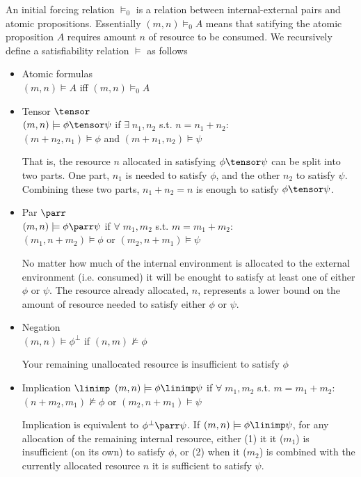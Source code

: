 An initial forcing relation $\models_0$ is a relation between
internal-external pairs and atomic propositions.  Essentially
$(m,n) \models_0 A$
means that satifying the atomic proposition $A$ requires amount $n$ of
resource to be consumed.  We recursively define a satisfiability
relation $\models$ as follows
\begin{itemize}
\item Atomic formulas\\
$(m,n) \models A$ iff $(m,n) \models_0 A$
\item Tensor $\tensor$\\
$(m,n) \models \phi\tensor\psi$ if $\exists \; n_1, n_2$ s.t. $n =
n_1+n_2$:\\
$(m+n_2,n_1)\models\phi$ and $(m+n_1,n_2)\models\psi$ 

That is, the resource $n$ allocated in satisfying $\phi\tensor\psi$
can be split into two parts. One part, $n_1$ is needed to satisfy
$\phi$, and the other $n_2$ to satisfy $\psi$.  Combining these two
parts, $n_1+n_2=n$ is enough to satisfy $\phi\tensor\psi$.

\item Par $\parr$\\
$(m,n) \models \phi\parr\psi$ if $\forall \; m_1, m_2$ s.t. $m =
m_1+m_2$:\\
$(m_1,n+m_2)\models\phi$ or $(m_2,n+m_1)\models\psi$ 

No matter how much of the internal environment is allocated to the
external environment (i.e. consumed) it will be enought to satisfy at
least one of either $\phi$ or $\psi$.  The resource already allocated,
$n$, represents a lower bound on the amount of resource needed to
satisfy either $\phi$ or $\psi$.

\item Negation\\
$(m,n) \models \phi^{\bot}$ if $(n,m)\not\models\phi$

Your remaining unallocated resource is insufficient to satisfy $\phi$

\item Implication $\linimp$
$(m,n) \models \phi\linimp\psi$ if $\forall \; m_1, m_2$ s.t. $m =
m_1+m_2$:\\
$(n+m_2,m_1)\not\models\phi$ or $(m_2,n+m_1)\models\psi$ 

Implication is equivalent to $\phi^{\bot}\parr\psi$. If 
$(m,n) \models \phi\linimp\psi$, for any allocation of the remaining
internal resource, either (1) it it ($m_1$) is insufficient (on its own) to
satisfy $\phi$, or (2) when it ($m_2$) is combined with the currently
allocated resource $n$ it is sufficient to satisfy $\psi$.


\end{itemize}
